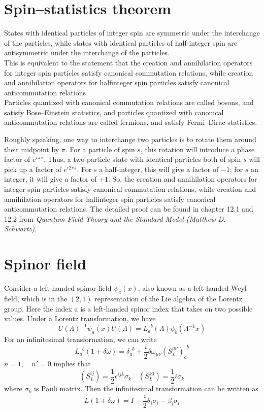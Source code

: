 \section{Spin–statistics theorem}
\begin{newthem}
States with identical particles of integer spin are symmetric under the interchange of the particles, while states with identical particles of half-integer spin are antisymmetric under the interchange of the particles. \\
This is equivalent to the statement that the creation and annihilation operators for integer spin particles satisfy canonical commutation relations, while creation and annihilation operators for halfinteger spin particles satisfy canonical anticommutation relations. \\
Particles quantized with canonical commutation relations are called bosons, and satisfy Bose–Einstein statistics, and particles quantized with canonical anticommutation relations are called fermions, and satisfy Fermi–Dirac statistics.
\end{newthem}
Roughly speaking,  one way to interchange two particles is to rotate them around their midpoint by $\pi$. For a particle of spin $s$, this rotation will introduce a phase factor of $e^{i\pi s}$. Thus, a two-particle state with identical particles both of spin $s$ will pick up a factor of $e^{i2\pi s}$. For s a half-integer, this will give a factor of $-1$; for $s$ an integer, it will give a factor of $+1$. So, the creation and annihilation operators for integer spin particles satisfy canonical commutation relations, while creation and annihilation operators for halfinteger spin particles satisfy canonical anticommutation relations. The detailed proof can be found in chapter 12.1 and 12.2 from \emph{Quantum Field Theory and the Standard Model (Matthew D. Schwartz)}.

\section{Spinor field}
Consider a left-handed spinor field $\psi_a(x)$, also known as a left-handed Weyl field, which is in the $(2,1)$ representation of the Lie algebra of the Lorentz group. Here the index a is a left-handed spinor index that takes on two possible values. Under a Lorentz transformation, we have
\[U(\Lambda)^{-1} \psi_a(x) U(\Lambda) = L_a^{\phantom{a}b}(\Lambda) \psi_b(\Lambda^{-1}x)\]
For an infinitesimal transformation, we can write
\[L_a^{\phantom{a}b}(1+\delta \omega) = \delta_a^{\phantom{a}b} + \frac{i}{2} \delta \omega_{\mu \nu} (S_L^{\mu \nu})_a^{\phantom{a}b}\]
$n=1, \quad n'=0$  implies that
\[(S_L^{i j}) = \frac{1}{2}\epsilon^{ijk}\sigma_k \quad  (S_L^{k 0}) = \frac{1}{2}i\sigma_k\]
where $\sigma_k$ is Pauli matrix.
Then the infinitesimal transformation can be written as
\[L(1+\delta \omega) = I - \frac{i}{2} \theta_i \sigma_i - \beta_i \sigma_i\]

